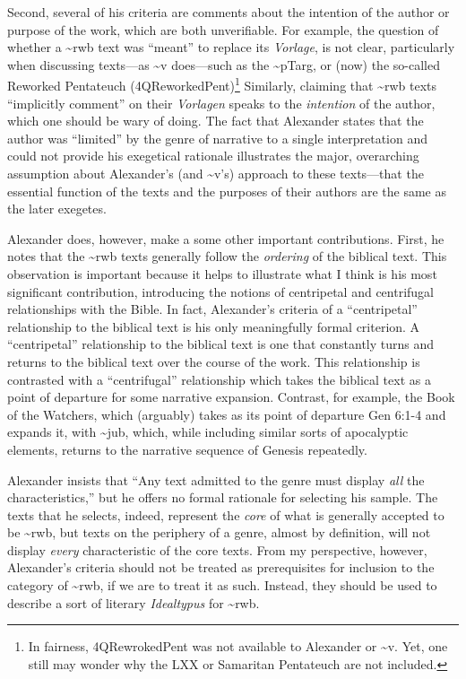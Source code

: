 Second, several of his criteria are comments about the intention of the
author or purpose of the work, which are both unverifiable. For example,
the question of whether a \textasciitilde{}rwb text was ``meant'' to
replace its \emph{Vorlage}, is not clear, particularly when discussing
texts---as \textasciitilde{}v does---such as the \textasciitilde{}pTarg,
or (now) the so-called Reworked Pentateuch (4QReworkedPent)\footnote{In
  fairness, 4QRewrokedPent was not available to Alexander or
  \textasciitilde{}v. Yet, one still may wonder why the LXX or Samaritan
  Pentateuch are not included.} Similarly, claiming that
\textasciitilde{}rwb texts ``implicitly comment'' on their
\emph{Vorlagen} speaks to the \emph{intention} of the author, which one
should be wary of doing. The fact that Alexander states that the author
was ``limited'' by the genre of narrative to a single interpretation and
could not provide his exegetical rationale illustrates the major,
overarching assumption about Alexander's (and \textasciitilde{}v's)
approach to these texts---that the essential function of the texts and
the purposes of their authors are the same as the later exegetes.

Alexander does, however, make a some other important contributions.
First, he notes that the \textasciitilde{}rwb texts generally follow the
\emph{ordering} of the biblical text. This observation is important
because it helps to illustrate what I think is his most significant
contribution, introducing the notions of centripetal and centrifugal
relationships with the Bible. In fact, Alexander's criteria of a
``centripetal'' relationship to the biblical text is his only
meaningfully formal criterion. A ``centripetal'' relationship to the
biblical text is one that constantly turns and returns to the biblical
text over the course of the work. This relationship is contrasted with a
``centrifugal'' relationship which takes the biblical text as a point of
departure for some narrative expansion. Contrast, for example, the Book
of the Watchers, which (arguably) takes as its point of departure Gen
6:1-4 and expands it, with \textasciitilde{}jub, which, while including
similar sorts of apocalyptic elements, returns to the narrative sequence
of Genesis repeatedly.

Alexander insists that ``Any text admitted to the genre must display
\emph{all} the characteristics,''\autocite[119 n.
11]{alexander_carson-williamson1988} but he offers no formal rationale
for selecting his sample. The texts that he selects, indeed, represent
the \emph{core} of what is generally accepted to be
\textasciitilde{}rwb, but texts on the periphery of a genre, almost by
definition, will not display \emph{every} characteristic of the core
texts. From my perspective, however, Alexander's criteria should not be
treated as prerequisites for inclusion to the category of
\textasciitilde{}rwb, if we are to treat it as such. Instead, they
should be used to describe a sort of literary \emph{Idealtypus} for
\textasciitilde{}rwb.

